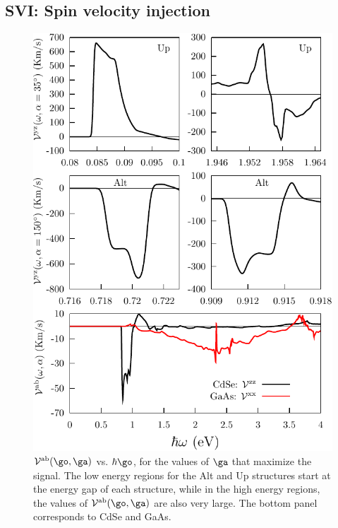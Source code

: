 \documentclass[prb,11pt,tightenlines,twocolumn,aps]{revtex4-1}
\begin{document}

\subsection{SVI: Spin velocity injection} %
\label{sec:res-spin_velocity}

\begin{figure}[t]
\centering
\includegraphics[width=\linewidth]{plots/2-vab-str-comp}
\caption{$\mathcal{V}^{\mathrm{ab}}(\go,\ga)$ 
  vs. $\hbar\go$, for the values of $\ga$ that maximize the signal. The low
  energy regions for the Alt and Up structures start at the energy gap of each
  structure, while in the high energy regions, the values of
  $\mathcal{V}^{\mathrm{ab}}(\go,\ga)$ are also very large. The bottom panel
  corresponds to CdSe and GaAs. }
\label{fig:vab-str-comp}
\end{figure}
\end{document}

